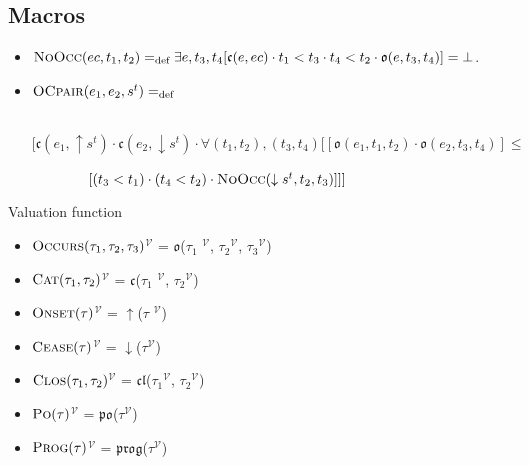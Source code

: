 \subsection{Macros}
\begin{itemize}
	\item $\textsc{NoOcc}(ec, t_1, t_2) =_{\text{def}} \exists e, t_3, t_4
		      [\mathfrak{c}(e, ec) \cdot t_1 < t_3 \cdot t_4 < t_2 \cdot \mathfrak{o}(e, t_3, t_4)] = \bot$.
	\item $\textsc{OCpair}(e_1, e_2, s^{t}) =_{\text{def}}$


	      \ \ \ \ \ \ \ \ $[ \mathfrak{c}(e_1, \uparrow s^t) \cdot \mathfrak{c}(e_2, \downarrow s^t) \cdot \forall (t_1, t_2), (t_3, t_4)[[
								      \mathfrak{o}(e_1, t_1, t_2) \cdot \mathfrak{o}(e_2, t_3, t_4)] \leq$

							      \ \ \ \ \ \ \ \ $[(t_3 < t_1) \cdot (t_4 < t_2) \cdot \textsc{NoOcc}(\downarrow s^t, t_2, t_3)]]]$
\end{itemize}

\begin{defn}Valuation function
	\begin{itemize}
		\item  \textlbrackdbl $\textsc{Occurs}(\tau_1, \tau_2, \tau_3)$\textrbrackdbl$^{\mathcal{V}}$
		      = $\mathfrak{o}$(\textlbrackdbl $\tau_1$ \textrbrackdbl$^{\mathcal{V}}$,
		      \textlbrackdbl $\tau_2$\textrbrackdbl$^{\mathcal{V}}$, \textlbrackdbl $\tau_3$\textrbrackdbl$^{\mathcal{V}}$)

		\item  \textlbrackdbl $\textsc{Cat}(\tau_1, \tau_2)$\textrbrackdbl$^{\mathcal{V}}$
		      = $\mathfrak{c}$(\textlbrackdbl $\tau_1$ \textrbrackdbl$^{\mathcal{V}}$,
		      \textlbrackdbl $\tau_2$\textrbrackdbl$^{\mathcal{V}}$)
		\item \textlbrackdbl $\textsc{Onset}(\tau)$\textrbrackdbl$^{\mathcal{V}}$
		      = $\uparrow$(\textlbrackdbl $\tau$ \textrbrackdbl$^{\mathcal{V}}$)

		\item \textlbrackdbl $\textsc{Cease}(\tau)$\textrbrackdbl$^{\mathcal{V}}$
		      = $\downarrow$(\textlbrackdbl $\tau$\textrbrackdbl$^{\mathcal{V}}$)
		\item \textlbrackdbl $\textsc{Clos}(\tau_1, \tau_2)$\textrbrackdbl$^{\mathcal{V}}$
		      = $\mathfrak{cl}$(\textlbrackdbl $\tau_1$\textrbrackdbl$^{\mathcal{V}}$,
		      \textlbrackdbl $\tau_2$\textrbrackdbl$^{\mathcal{V}}$)
		\item \textlbrackdbl $\textsc{Po}(\tau)$\textrbrackdbl$^{\mathcal{V}}$
		      = $\mathfrak{po}$(\textlbrackdbl $\tau$\textrbrackdbl$^{\mathcal{V}}$)
		\item \textlbrackdbl $\textsc{Prog}(\tau)$\textrbrackdbl$^{\mathcal{V}}$
		      = $\mathfrak{prog}$(\textlbrackdbl $\tau$\textrbrackdbl$^{\mathcal{V}}$)

	\end{itemize}
\end{defn}
